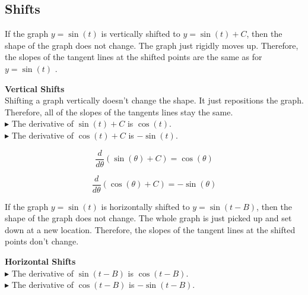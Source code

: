 \documentclass{ximera}
\begin{document}
\subsection*{Shifts}




If the graph $y = \sin(t)$ is vertically shifted to $y = \sin(t)+C$, then the shape of the graph does not change. The graph just rigidly moves up. Therefore, the slopes of the tangent lines at the shifted points are the same as for $y = \sin(t)$ .



\begin{observation} \textbf{\textcolor{purple!85!blue}{Vertical Shifts}}  \\

Shifting a graph vertically doesn't change the shape.  It just repositions the graph.  Therefore, all of the slopes of the tangents lines stay the same. \\



$\blacktriangleright$ The derivative of $\sin(t)+C$ is $\cos(t)$. \\

$\blacktriangleright$ The derivative of $\cos(t)+C$ is $-\sin(t)$. \\

\end{observation}


\begin{notation}

\[
\frac{d}{d\theta} (\sin(\theta) + C) = \cos(\theta)
\]

\[
\frac{d}{d\theta} (\cos(\theta) + C) = -\sin(\theta)
\]

\end{notation}


If the graph $y = \sin(t)$ is horizontally shifted to $y = \sin(t - B)$, then the shape of the graph does not change. The whole graph is just picked up and set down at a new location. Therefore, the slopes of the tangent lines at the shifted points don't change.



\begin{observation} \textbf{\textcolor{purple!85!blue}{Horizontal Shifts}} \\

$\blacktriangleright$ The derivative of $\sin(t - B)$ is $\cos(t - B)$. \\

$\blacktriangleright$ The derivative of $\cos(t - B)$ is $-\sin(t - B)$. \\

\end{observation}
\end{document}
